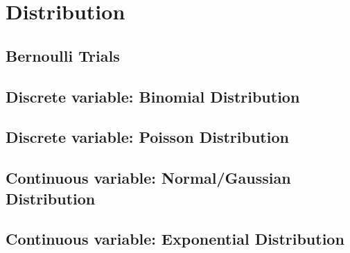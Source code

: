 \graphicspath{%
{chapter1graph/}%
{chapter1graph/bg/}}


\chapter{Distribution}



\section{Bernoulli Trials}

\section{Discrete variable: Binomial Distribution}

\section{Discrete variable: Poisson Distribution}

\section{Continuous variable: Normal/Gaussian Distribution}

\section{Continuous variable: Exponential Distribution}



